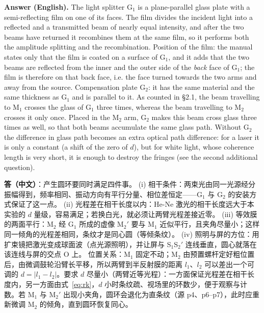 \documentclass[11pt]{ctexart}
\newcommand{\Dl}{d}
\newcommand{\qaneed}[1]{\needspace{#1\textheight}}
\begin{document}
\textbf{Answer (English).} The light splitter G$_1$ is a plane-parallel glass plate with a semi-reflecting film on one of its faces. The film divides the incident light into a reflected and a transmitted beam of nearly equal intensity, and after the two beams have returned it recombines them at the same film, so it performs both the amplitude splitting and the recombination.
Position of the film: the manual states only that the film is coated on a surface of G$_1$, and it adds that the two beams are reflected from the inner and the outer side of the \emph{back} face of G$_1$; the film is therefore on that back face, i.e. the face turned towards the two arms and away from the source.
Compensation plate G$_2$: it has the same material and the same thickness as G$_1$ and is parallel to it. As counted in §2.1, the beam travelling to M$_1$ crosses the glass of G$_1$ three times, whereas the beam travelling to M$_2$ crosses it only once. Placed in the M$_2$ arm, G$_2$ makes this beam cross glass three times as well, so that both beams accumulate the same glass path. Without G$_2$ the difference in glass path becomes an extra optical path difference: for a laser it is only a constant (a shift of the zero of $\Dl$), but for white light, whose coherence length is very short, it is enough to destroy the fringes (see the second additional question).

\qaneed{0.72}


\textbf{答（中文）}：产生圆环要同时满足四件事。
(i) 相干条件：两束光由同一光源经分振幅得到，频率相同、振动方向有平行分量、相位差恒定——G$_1$ 与 G$_2$ 的安装方式保证了这一点。
(ii) 光程差在相干长度以内：He-Ne 激光的相干长度远大于本实验的 $\Dl$ 量级，容易满足；若换白光，就必须让两臂光程差接近零。
(iii) 等效膜的两面平行：M$_2$ 经 G$_1$ 所成的虚像 M$_2'$ 要与 M$_1$ 近似平行，且夹角尽量小；这样同一倾角的光程差相同，条纹才是同心圆（等倾条纹）。
(iv) 照明与屏的方位：用扩束镜把激光变成球面波（点光源照明），并让屏与 S$_1$S$_2'$ 连线垂直，圆心就落在该连线与屏的交点 O 上。
位置关系：M$_1$ 固定不动；M$_2$ 由预置螺杆定好粗位置后，由微调鼓轮沿臂长平移，所以两臂到半反射膜的距离 $l_1$、$l_2$ 可以差出一个可调的 $\Dl=|l_1-l_2|$。要求 $\Dl$ 尽量小（两臂近等光程）：一方面保证光程差在相干长度内，另一方面由式~\eqref{eq:rk}，$\Dl$ 小时条纹疏、视场里的环数少，便于观察与计数。若 M$_1$ 与 M$_2'$ 出现小夹角，圆环会退化为直条纹（源 p4、p6--p7），此时应重新微调 M$_2$ 的倾角，直到圆环恢复同心。
\end{document}
